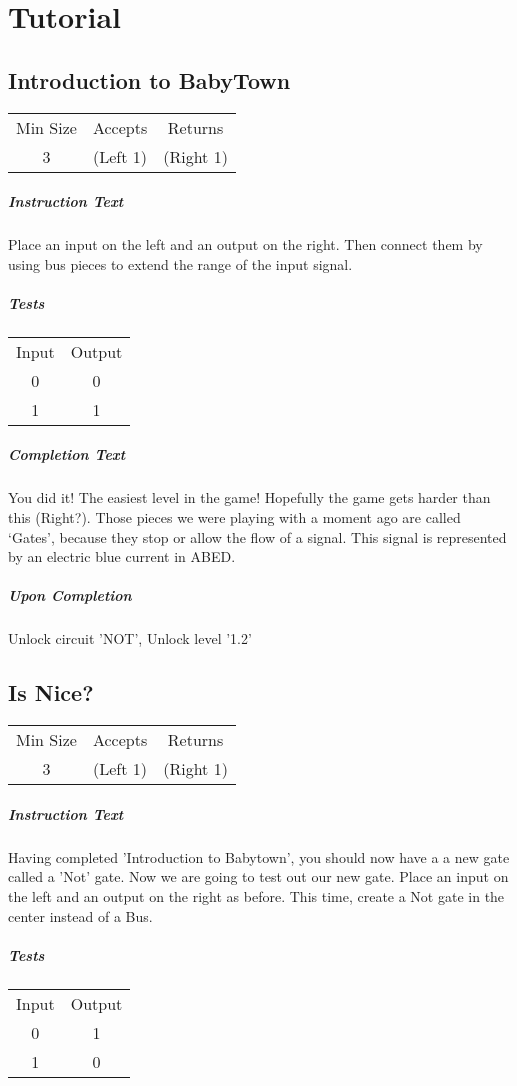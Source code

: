 ﻿\documentclass[a4paper, 12pt]{article}
\begin{document}
\tableofcontents
	
\section{Tutorial}
\subsection{Introduction to BabyTown}
\begin{tabular}{ccc}
	Min Size & Accepts & Returns \\ 
	3 & (Left 1) & (Right 1)
\end{tabular}

\subparagraph{Instruction Text}
Place an input on the left and an output on the right. Then connect them by using bus pieces to extend the range of the input signal.

\subparagraph{Tests}

\begin{tabular}{ c c }
	Input & Output \\ 
	0 & 0 \\  
	1 & 1     
\end{tabular}

\subparagraph{Completion Text}
You did it! The easiest level in the game! Hopefully the game gets harder than this (Right?). Those pieces we were playing with a moment ago are called ‘Gates’, because they stop or allow the flow of a signal. This signal is represented by an electric blue current in ABED.

\subparagraph{Upon Completion}
Unlock circuit 'NOT', Unlock level '1.2'

\subsection{Is Nice?}
\begin{tabular}{ccc}
	Min Size & Accepts & Returns \\ 
	3 & (Left 1) & (Right 1)
\end{tabular}

\subparagraph{Instruction Text}
Having completed 'Introduction to Babytown', you should now have a a new gate called a 'Not' gate. Now we are going to test out our new gate. Place an input on the left and an output on the right as before. This time, create a Not gate in the center instead of a Bus.

\subparagraph{Tests}
\begin{tabular}{ c c }
	Input & Output \\ 
	0 & 1 \\  
	1 & 0     
\end{tabular}
\end{document}
